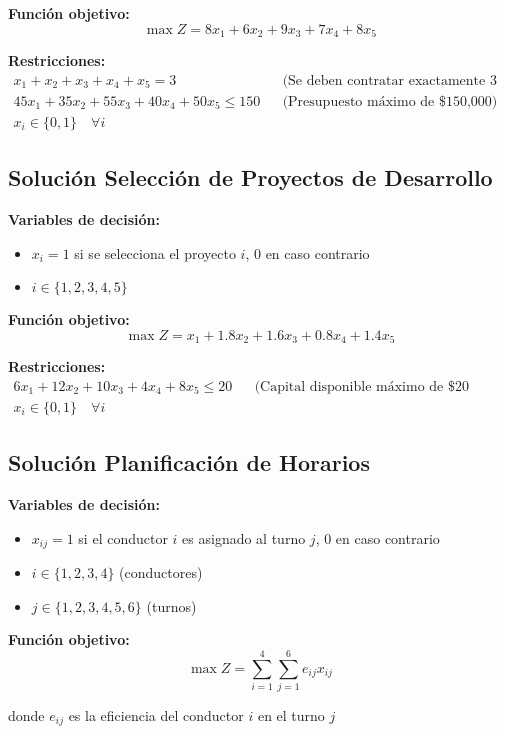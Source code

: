 \documentclass[12pt]{article}
\begin{document}
\textbf{Función objetivo:}
$$\max Z = 8x_1 + 6x_2 + 9x_3 + 7x_4 + 8x_5$$

\textbf{Restricciones:}
\begin{align*}
    x_1 + x_2 + x_3 + x_4 + x_5 = 3 && \text{(Se deben contratar exactamente 3 empleados)} \\
    45x_1 + 35x_2 + 55x_3 + 40x_4 + 50x_5 \leq 150 && \text{(Presupuesto máximo de \$150,000)} \\
    x_i \in \{0,1\} \quad \forall i
\end{align*}

\subsection{Solución Selección de Proyectos de Desarrollo}

\textbf{Variables de decisión:}
\begin{itemize}
    \item $x_i = 1$ si se selecciona el proyecto $i$, 0 en caso contrario
    \item $i \in \{1, 2, 3, 4, 5\}$
\end{itemize}

\textbf{Función objetivo:}
$$\max Z = x_1 + 1.8x_2 + 1.6x_3 + 0.8x_4 + 1.4x_5$$

\textbf{Restricciones:}
\begin{align*}
    6x_1 + 12x_2 + 10x_3 + 4x_4 + 8x_5 \leq 20 && \text{(Capital disponible máximo de \$20 millones)} \\
    x_i \in \{0,1\} \quad \forall i
\end{align*}

\subsection{Solución Planificación de Horarios}

\textbf{Variables de decisión:}
\begin{itemize}
    \item $x_{ij} = 1$ si el conductor $i$ es asignado al turno $j$, 0 en caso contrario
    \item $i \in \{1, 2, 3, 4\}$ (conductores)
    \item $j \in \{1, 2, 3, 4, 5, 6\}$ (turnos)
\end{itemize}

\textbf{Función objetivo:}
$$\max Z = \sum_{i=1}^{4} \sum_{j=1}^{6} e_{ij} x_{ij}$$
\begin{center}
donde $e_{ij}$ es la eficiencia del conductor $i$ en el turno $j$
\end{center}
\end{document}

